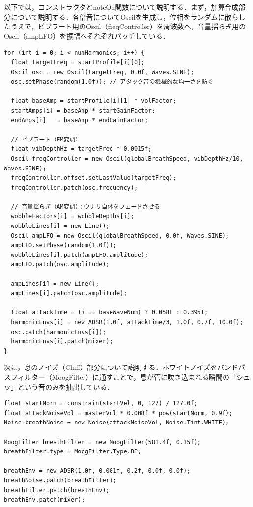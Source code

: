 以下では，コンストラクタとnoteOn関数について説明する．まず，加算合成部分について説明する．各倍音についてOscilを生成し，位相をランダムに散らしたうえで，ビブラート用のOscil（freqController）を周波数へ，音量揺らぎ用のOscil（ampLFO）を振幅へそれぞれパッチしている．

\begin{lstlisting}[caption={FluteInstrumentコンストラクタ（加算合成部分）}, label={lst:gakki_flute_ctor}]
for (int i = 0; i < numHarmonics; i++) {
  float targetFreq = startProfile[i][0];
  Oscil osc = new Oscil(targetFreq, 0.0f, Waves.SINE);
  osc.setPhase(random(1.0f)); // アタック音の機械的な均一さを防ぐ

  float baseAmp = startProfile[i][1] * volFactor;
  startAmps[i] = baseAmp * startGainFactor;
  endAmps[i]   = baseAmp * endGainFactor;

  // ビブラート（FM変調）
  float vibDepthHz = targetFreq * 0.0015f;
  Oscil freqController = new Oscil(globalBreathSpeed, vibDepthHz/10, Waves.SINE);
  freqController.offset.setLastValue(targetFreq);
  freqController.patch(osc.frequency);

  // 音量揺らぎ（AM変調）：ウナリ自体をフェードさせる
  wobbleFactors[i] = wobbleDepths[i];
  wobbleLines[i] = new Line();
  Oscil ampLFO = new Oscil(globalBreathSpeed, 0.0f, Waves.SINE);
  ampLFO.setPhase(random(1.0f));
  wobbleLines[i].patch(ampLFO.amplitude);
  ampLFO.patch(osc.amplitude);

  ampLines[i] = new Line();
  ampLines[i].patch(osc.amplitude);

  float attackTime = (i == baseWaveNum) ? 0.058f : 0.395f;
  harmonicEnvs[i] = new ADSR(1.0f, attackTime/3, 1.0f, 0.7f, 10.0f);
  osc.patch(harmonicEnvs[i]);
  harmonicEnvs[i].patch(mixer);
}
\end{lstlisting}

次に，息のノイズ（Chiff）部分について説明する．ホワイトノイズをバンドパスフィルター（MoogFilter）に通すことで，息が管に吹き込まれる瞬間の「シュッ」という音のみを抽出している．

\begin{lstlisting}[caption={FluteInstrumentコンストラクタ（息ノイズ部分）}, label={lst:gakki_flute_breath}]
float startNorm = constrain(startVel, 0, 127) / 127.0f;
float attackNoiseVol = masterVol * 0.008f * pow(startNorm, 0.9f);
Noise breathNoise = new Noise(attackNoiseVol, Noise.Tint.WHITE);

MoogFilter breathFilter = new MoogFilter(581.4f, 0.15f);
breathFilter.type = MoogFilter.Type.BP;

breathEnv = new ADSR(1.0f, 0.001f, 0.2f, 0.0f, 0.0f);
breathNoise.patch(breathFilter);
breathFilter.patch(breathEnv);
breathEnv.patch(mixer);
\end{lstlisting}

